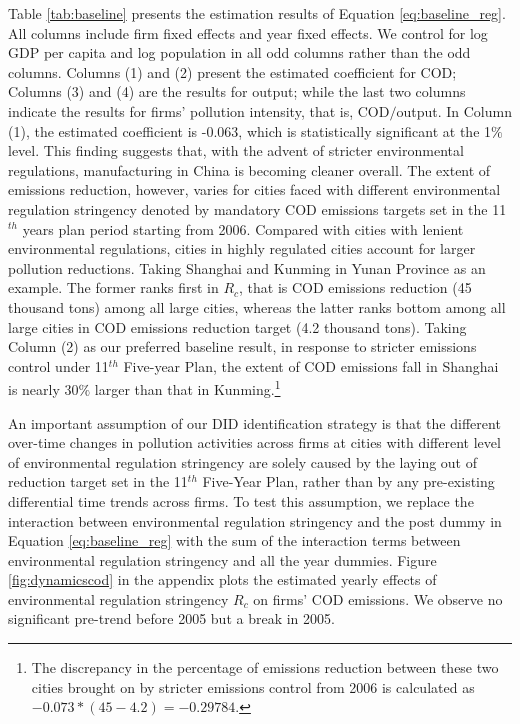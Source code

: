 \documentclass[12pt,english]{article}
\begin{document}
Table \ref{tab:baseline} presents the estimation results of Equation \ref{eq:baseline_reg}. All columns include firm fixed effects and year fixed effects. We control for log GDP per capita and log population in all odd columns rather than the odd columns. Columns (1) and (2) present the estimated coefficient for COD; Columns (3) and (4) are the results for output; while the last two columns indicate the results for firms' pollution intensity, that is, COD$/$output. In Column (1), the estimated coefficient is -0.063, which is statistically significant at the 1$\%$ level. This finding suggests that, with the advent of stricter environmental regulations, manufacturing in China is becoming cleaner overall. The extent of emissions reduction, however, varies for cities faced with different environmental regulation stringency denoted by mandatory COD emissions targets set in the 11$^{th}$ years plan period starting from 2006. Compared with cities with lenient environmental regulations, cities in highly regulated cities account for larger pollution reductions. Taking Shanghai and Kunming in Yunan Province as an example. The former ranks first in ${R}_{c}$, that is COD emissions reduction (45 thousand tons) among all large cities, whereas the latter ranks bottom among all large cities in COD emissions reduction target (4.2 thousand tons). Taking Column (2) as our preferred baseline result, in response to stricter emissions control under 11$^{th}$ Five-year Plan, the extent of COD emissions fall in Shanghai is nearly 30$\%$ larger than that in Kunming.\footnote{The discrepancy in the percentage of emissions reduction between these two cities brought on by stricter emissions control from 2006 is calculated as $-0.073*(45-4.2)=-0.29784$.}

An important assumption of our DID identification strategy is that the different over-time changes in pollution activities across firms at cities with different level of environmental regulation stringency are solely caused by the laying out of reduction target set in the 11$^{th}$ Five-Year Plan, rather than by any pre-existing differential time trends across firms. To test this assumption, we replace the interaction between environmental regulation stringency and the post dummy in Equation \ref{eq:baseline_reg} with the sum of the interaction terms between environmental regulation stringency and all the year dummies. Figure \ref{fig:dynamicscod} in the appendix plots the estimated yearly effects of environmental regulation stringency $R_{c}$ on firms' COD emissions. We observe no significant pre-trend before 2005 but a break in 2005.
\end{document}
